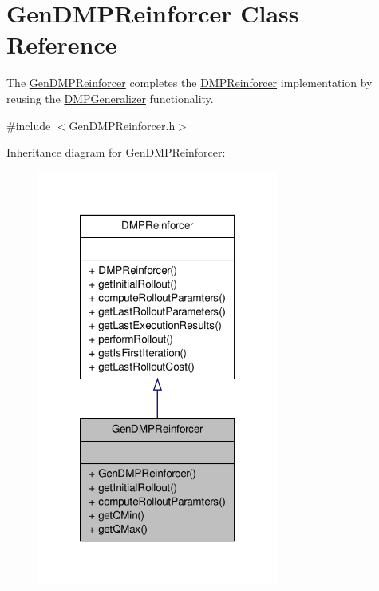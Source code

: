 \hypertarget{classGenDMPReinforcer}{\section{\-Gen\-D\-M\-P\-Reinforcer \-Class \-Reference}
\label{classGenDMPReinforcer}
}


\-The \hyperlink{classGenDMPReinforcer}{\-Gen\-D\-M\-P\-Reinforcer} completes the \hyperlink{classDMPReinforcer}{\-D\-M\-P\-Reinforcer} implementation by reusing the \hyperlink{classDMPGeneralizer}{\-D\-M\-P\-Generalizer} functionality.  




{\ttfamily \#include $<$\-Gen\-D\-M\-P\-Reinforcer.\-h$>$}



\-Inheritance diagram for \-Gen\-D\-M\-P\-Reinforcer\-:
\nopagebreak
\begin{figure}[H]
\begin{center}
\leavevmode
\includegraphics[width=224pt]{classGenDMPReinforcer__inherit__graph}
\end{center}
\end{figure}


